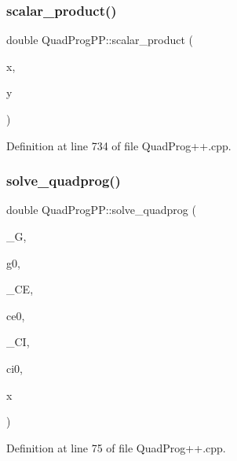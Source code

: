 \subsubsection{\texorpdfstring{scalar\+\_\+product()}{scalar\_product()}}
{\footnotesize\ttfamily double Quad\+Prog\+P\+P\+::scalar\+\_\+product (\begin{DoxyParamCaption}\item[{const Eigen\+::\+Vector\+Xd \&}]{x,  }\item[{const Eigen\+::\+Vector\+Xd \&}]{y }\end{DoxyParamCaption})\hspace{0.3cm}{\ttfamily [inline]}}



Definition at line 734 of file Quad\+Prog++.\+cpp.

\hypertarget{namespaceQuadProgPP_a3660acf00652641e6b81b5106a44efbd}{}\label{namespaceQuadProgPP_a3660acf00652641e6b81b5106a44efbd} 
\subsubsection{\texorpdfstring{solve\+\_\+quadprog()}{solve\_quadprog()}}
{\footnotesize\ttfamily double Quad\+Prog\+P\+P\+::solve\+\_\+quadprog (\begin{DoxyParamCaption}\item[{const Eigen\+::\+Matrix\+Xd \&}]{\+\_\+G,  }\item[{const Eigen\+::\+Vector\+Xd \&}]{g0,  }\item[{const Eigen\+::\+Matrix\+Xd \&}]{\+\_\+\+CE,  }\item[{const Eigen\+::\+Vector\+Xd \&}]{ce0,  }\item[{const Eigen\+::\+Matrix\+Xd \&}]{\+\_\+\+CI,  }\item[{const Eigen\+::\+Vector\+Xd \&}]{ci0,  }\item[{Eigen\+::\+Vector\+Xd \&}]{x }\end{DoxyParamCaption})}



Definition at line 75 of file Quad\+Prog++.\+cpp.

\hypertarget{namespaceQuadProgPP_a633fa931fb0b0d4cc2ba0dcb00cbf4b7}{}\label{namespaceQuadProgPP_a633fa931fb0b0d4cc2ba0dcb00cbf4b7} 
